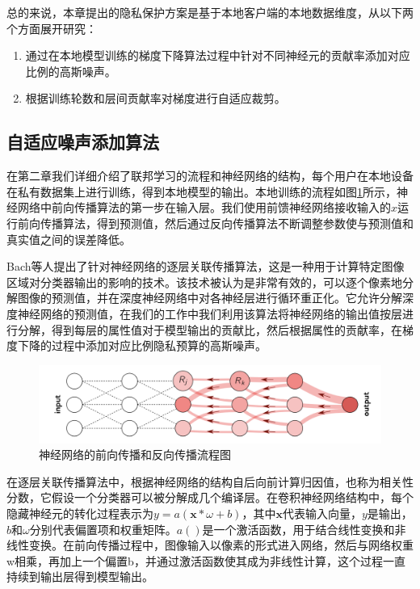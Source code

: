 总的来说，本章提出的隐私保护方案是基于本地客户端的本地数据维度，从以下两个方面展开研究：
\begin{enumerate}
\item [(1)] 通过在本地模型训练的梯度下降算法过程中针对不同神经元的贡献率添加对应比例的高斯噪声。
\item [(2)] 根据训练轮数和层间贡献率对梯度进行自适应裁剪。
\end{enumerate}

\subsection{自适应噪声添加算法}
在第二章我们详细介绍了联邦学习的流程和神经网络的结构，每个用户在本地设备在私有数据集上进行训练，得到本地模型的输出。本地训练的流程如图\ref{fig:神经网络的前向传播和反向传播流程图}所示，神经网络中前向传播算法的第一步在输入层。我们使用前馈神经网络接收输入的$x$运行前向传播算法，得到预测值，然后通过反向传播算法不断调整参数使与预测值和真实值之间的误差降低。

Bach等人提出了针对神经网络的逐层关联传播算法，这是一种用于计算特定图像区域对分类器输出的影响的技术。该技术被认为是非常有效的，可以逐个像素地分解图像的预测值，并在深度神经网络中对各神经层进行循环重正化。它允许分解深度神经网络的预测值，在我们的工作中我们利用该算法将神经网络的输出值按层进行分解，得到每层的属性值对于模型输出的贡献比，然后根据属性的贡献率，在梯度下降的过程中添加对应比例隐私预算的高斯噪声。

\begin{figure}[!hbt]
\centering
	\includegraphics[scale=0.45]{fig2/C3/逐层关联传播算法}%
	\caption{神经网络的前向传播和反向传播流程图}
	\label{fig:神经网络的前向传播和反向传播流程图}	
\end{figure}

在逐层关联传播算法中，根据神经网络的结构自后向前计算归因值，也称为相关性分数，它假设一个分类器可以被分解成几个编译层。在卷积神经网络结构中，每个隐藏神经元的转化过程表示为$y=a(\mathbf{x} * \omega+b)$，其中$\mathbf{x}$代表输入向量，$y$是输出，$b$和$\omega$分别代表{}偏置项和权重矩阵。$a()$是一个激活函数，用于结合线性变换和非线性变换。在前向传播过程中，图像输入以像素的形式进入网络，然后与网络权重w相乘，再加上一个偏置b，并通过激活函数使其成为非线性计算，这个过程一直持续到输出层得到模型输出。

